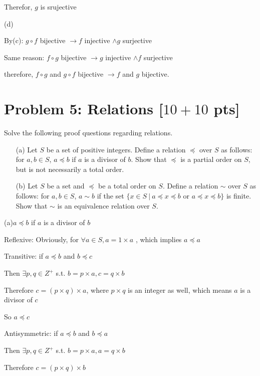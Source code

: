 \documentclass[11pt,twoside]{article}
\newcommand{\problem}[1]{\section*{Problem #1}}
\begin{document}
Therefor, $g$ is srujective

\hspace*{\fill}

(d)

By(c): $g \circ f$ bijective $\rightarrow f$  injective  $\land g$ surjective

Same reason: $f \circ g$ bijective $\rightarrow g$  injective  $\land f$ surjective


therefore, $f \circ g$ and $g \circ f$ bijective $\rightarrow f$ and $g$ bijective.






\problem{5: Relations [$10+10$ pts]}
Solve the following proof questions regarding relations.

\begin{enumerate}
    \item [(a)]
    Let $S$ be a set of positive integers.
    Define a relation $\preceq$ over $S$ as follows: for $a,b \in S$, $a \preceq b$ if $a$ is a divisor of $b$.
    Show that $\preceq$ is a partial order on $S$, but is not necessarily a total order.
    \item[(b)]
    Let $S$ be a set and $\preceq$ be a total order on $S$.
    Define a relation $\sim$ over $S$ as follows: for $a,b \in S$, $a \sim b$ if the set $\{x \in S\ |\ a \preceq x \preceq b \text{ or } a \preceq x \preceq b\}$ is finite.
    Show that $\sim$ is an equivalence relation over $S$.
\end{enumerate}




\hspace*{\fill}

(a)$a \preceq b$ if $a$ is a divisor of $b$

Reflexive: Obviously, for $\forall a \in S, a = 1 \times a$ , which implies $a \preceq a$

Transitive: if $a \preceq b$ and $b \preceq c$

Then $\exists p,q \in Z^+$ s.t. $b = p\times a, c = q\times b$

Therefore $c=(p\times q)\times a$, where $p\times q$ is an integer as well, which means $a$ is a divisor of $c$

So $a \preceq c$


Antisymmetric: if $a \preceq b$ and $b \preceq a$

Then $\exists p,q \in Z^+$ s.t. $b = p\times a, a = q\times b$

Therefore $c=(p\times q)\times b$
\end{document}
